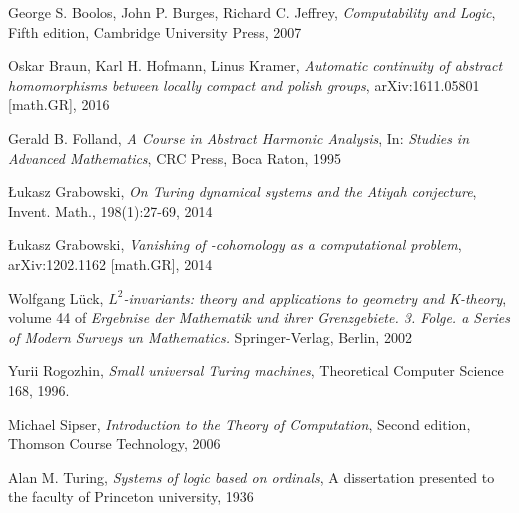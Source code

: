 \begin{thebibliography}{1}

	George S. Boolos, John P. Burges, Richard C. Jeffrey,
	\emph{Computability and Logic},
	Fifth edition,
	Cambridge University Press,
	2007

	Oskar Braun, Karl H. Hofmann, Linus Kramer,
	\emph{Automatic continuity of abstract homomorphisms between locally compact and polish groups},
	arXiv:1611.05801 [math.GR],
	2016

	Gerald B. Folland,
	\emph{A Course in Abstract Harmonic Analysis},
	In: \emph{Studies in Advanced Mathematics},
	CRC Press,
	Boca Raton,
	1995

	\L{}ukasz Grabowski,
	\emph{On Turing dynamical systems and the Atiyah conjecture},
	Invent. Math., 198(1):27-69,
	2014

	\L{}ukasz Grabowski,
	\emph{Vanishing of \ltwo-cohomology as a computational problem},
	arXiv:1202.1162 [math.GR],
	2014

	Wolfgang L\"uck,
	\emph{$L^2$-invariants: theory and applications to geometry and K-theory},
	volume 44 of \emph{Ergebnise der Mathematik und ihrer Grenzgebiete. 3. Folge. a Series of Modern Surveys un Mathematics.}
	Springer-Verlag, Berlin,
	2002

	Yurii Rogozhin,
	\emph{Small universal Turing machines},
	Theoretical Computer Science 168,
	1996.

	Michael Sipser,
	\emph{Introduction to the Theory of Computation},
	Second edition,
	Thomson Course Technology,
	2006

	Alan M. Turing,
	\emph{Systems of logic based on ordinals},
	A dissertation presented to the faculty of Princeton university,
	1936

\end{thebibliography}
